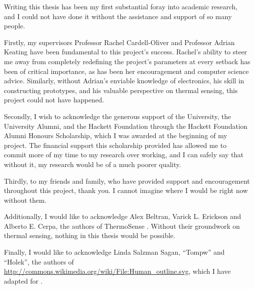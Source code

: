 \documentclass{../cshonours}
\renewcommand{\listoflistings}{%
  \cleardoublepage
  \listof{listing}{\listoflistingscaption}%
}
\begin{document}
\begin{acknowledgements}
Writing this thesis has been my first substantial foray into academic research, and I could not have done it without the assistance and support of so many people.

Firstly, my supervisors Professor Rachel Cardell-Oliver and Professor Adrian Keating have been fundamental to this project's success. Rachel's ability to steer me away from completely redefining the project's parameters at every setback has been of critical importance, as has been her encouragement and computer science advice. Similarly, without Adrian's enviable knowledge of electronics, his skill in constructing prototypes, and his valuable perspective on thermal sensing, this project could not have happened.

Secondly, I wish to acknowledge the generous support of the University, the University Alumni, and the Hackett Foundation through the Hackett Foundation Alumni Honours Scholarship, which I was awarded at the beginning of my project. The financial support this scholarship provided has allowed me to commit more of my time to my research over working, and I can safely say that without it, my research would be of a much poorer quality.

Thirdly, to my friends and family, who have provided support and encouragement throughout this project, thank you. I cannot imagine where I would be right now without them. %

Additionally, I would like to acknowledge Alex Beltran, Varick L. Erickson and Alberto E. Cerpa, the authors of ThermoSense \cite{beltran2013thermosense}. Without their groundwork on thermal sensing, nothing in this thesis would be possible.

Finally, I would like to acknowledge Linda Salzman Sagan, ``Tompw'' and ``Holek'', the authors of \url{http://commons.wikimedia.org/wiki/File:Human_outline.svg}, which I have adapted for .

\end{acknowledgements}

\tableofcontents
\listoftables
\listoffigures
\listoflistings










\appendix


\end{document}
